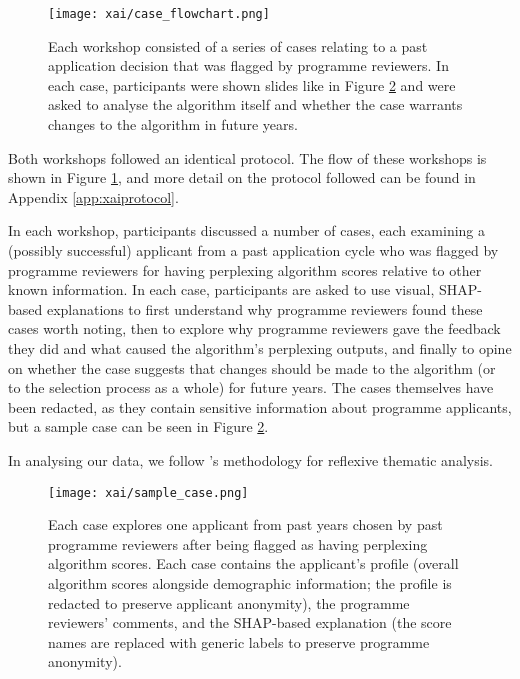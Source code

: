 \begin{figure}[htbp]
    \centering
    \texttt{[image: xai/case\_flowchart.png]}
    \caption{Each workshop consisted of a series of cases relating to a past application decision that was flagged by programme reviewers. In each case, participants were shown slides like in Figure \ref{fig:sample_case} and were asked to analyse the algorithm itself and whether the case warrants changes to the algorithm in future years.}
    \label{fig:case_flowchart}
\end{figure}

Both workshops followed an identical protocol. The flow of these workshops is shown in Figure \ref{fig:case_flowchart}, and more detail on the protocol followed can be found in Appendix \ref{app:xaiprotocol}.

In each workshop, participants discussed a number of cases, each examining a (possibly successful) applicant from a past application cycle who was flagged by programme reviewers for having perplexing algorithm scores relative to other known information. In each case, participants are asked to use visual, SHAP-based explanations to first understand why programme reviewers found these cases worth noting, then to explore why programme reviewers gave the feedback they did and what caused the algorithm's perplexing outputs, and finally to opine on whether the case suggests that changes should be made to the algorithm (or to the selection process as a whole) for future years. The cases themselves have been redacted, as they contain sensitive information about programme applicants, but a sample case can be seen in Figure \ref{fig:sample_case}.

In analysing our data, we follow \textcite{braun_using_2006}'s methodology for reflexive thematic analysis. 

\begin{figure}[htbp]
    \centering
    \texttt{[image: xai/sample\_case.png]}
    \caption{Each case explores one applicant from past years chosen by past programme reviewers after being flagged as having perplexing algorithm scores. Each case contains the applicant's profile (overall algorithm scores alongside demographic information; the profile is redacted to preserve applicant anonymity), the programme reviewers' comments, and the SHAP-based explanation (the score names are replaced with generic labels to preserve programme anonymity).}
    \label{fig:sample_case}
    
\end{figure}

